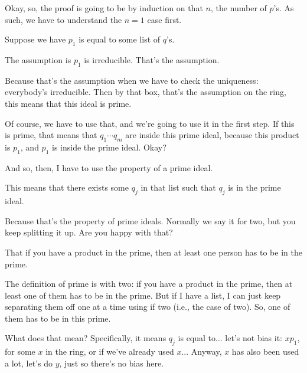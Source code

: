 \begin{proofWrapper}[Proof of \cref{clm:step1-uniqueness}]
\begin{speech}[00:36:03 - 00:37:55]
Okay, so, the proof is going to be by induction on that $n$, the number of $p$'s. As such, we have to understand the $n = 1$ case first.

Suppose we have $p_1$ is equal to some list of $q$'s. 

The assumption is $p_1$ is irreducible.  That's the assumption.

Because that's the assumption when we have to check the uniqueness: everybody's irreducible. Then by that box,  that's the assumption on the ring, this means that this ideal  is prime.

Of course, we have to use that, and we're going to use it in the first step. If this is prime, that means that $q_1 \cdots q_m$ are inside this prime ideal,  because this product is $p_1$, and $p_1$ is inside the prime ideal. Okay?

And so, then, I have to use the property of a prime ideal.

This means that there exists some $q_j$  in that list such that  $q_j$ is in the prime ideal. 

Because that's the property of prime ideals. Normally we say it for two, but you keep splitting it up. Are you happy with that?

That if you have a product in the prime, then at least one person has to be in the prime.

The definition of prime is with two: if you have a product in the prime, then at least one of them has to be in the prime. But if I have a list, I can just keep separating them off one at a time using if two (i.e., the case of two). So, one of them has to be in this prime.
\end{speech}

\begin{speech}[00:37:55 - 00:39:17]
What does that mean? Specifically, it means $q_j$ is equal to... let's not bias it: $x p_1$,  for some  $x$ in the ring, or if we've already used $x$... Anyway, $x$ has also been used a lot, let's do $y$, just so there's no bias here. 


\end{speech}
\end{proofWrapper}
